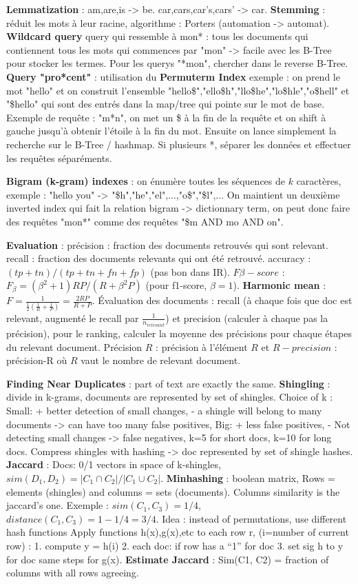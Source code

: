 \documentclass[9pt,a4paper]{report}
\begin{document}
\textbf{Lemmatization} : am,are,is -> be. car,cars,car's,cars' -> car. \textbf{Stemming} : réduit les mots à leur racine, algorithme : Porters (automation -> automat). \textbf{Wildcard query} query qui ressemble à mon* : tous les documents qui contiennent tous les mots qui commences par "mon" -> facile avec les B-Tree pour stocker les termes. Pour les querys "*mon", chercher dans le reverse B-Tree. \textbf{Query "pro*cent"} : utilisation du \textbf{Permuterm Index} exemple : on prend le mot "hello" et on construit l'ensemble "hello\$","ello\$h","llo\$he","lo\$hle","o\$hell" et "\$hello" qui sont des entrés dans la map/tree qui pointe sur le mot de base. Exemple de requête : "m*n", on met un \$ à la fin de la requête et on shift à gauche jusqu'à obtenir l'étoile à la fin du mot. Ensuite on lance simplement la recherche sur le B-Tree / hashmap. Si plusieurs *, séparer les données et effectuer les requêtes séparéments.

\textbf{Bigram (k-gram) indexes} : on énumère toutes les séquences de $k$ caractères, exemple : "hello you" -> "\$h","he","el",...,"o\$","\$l",... On maintient un deuxième inverted index qui fait la relation bigram -> dictionnary term, on peut donc faire des requêtes "mon*" comme des requêtes "\$m AND mo AND on".

\textbf{Evaluation} : précision : fraction des documents retrouvés qui sont relevant. recall : fraction des documents relevants qui ont été retrouvé. accuracy : $(tp+tn)/(tp+tn+fn+fp)$ (pas bon dans IR). $F\beta-score$ : $F_\beta=(\beta^2+1)RP/(R+\beta^2P)$ (pour f1-score, $\beta=1$). \textbf{Harmonic mean} : $F=\frac{1}{\frac{1}{2}(\frac{1}{R}+\frac{1}{P})}=\frac{2RP}{R+P}$. Évaluation des documents : recall (à chaque fois que doc est relevant, augmenté le recall par $\frac{1}{n_{relevant}}$) et precision (calculer à chaque pas la précision), pour le ranking, calculer la moyenne des précisions pour chaque étapes du relevant document. Précision $R$ : précision à l'élément $R$ et $R-precision$ : précision-R où $R$ vaut le nombre de relevant document.

\textbf{Finding Near Duplicates} : part of text are exactly the same. \textbf{Shingling} : divide in k-grams, documents are represented by set of shingles. Choice of k : Small: + better detection of small changes, - a shingle will belong to many documents -> can have too many false positives, Big: + less false positives, - Not detecting small changes -> false negatives, k=5 for short docs, k=10 for long docs. Compress shingles with hashing -> doc represented by set of shingle hashes. \textbf{Jaccard} : Docs: 0/1 vectors in space of k-shingles, $sim(D_1,D_2)=|C_1 \cap C_2|/|C_1\cup C_2|$. \textbf{Minhashing} : boolean matrix, Rows = elements (shingles) and columns = sets (documents). Columns similarity is the jaccard's one. Exemple : $sim(C_1,C_3)=1/4$, $distance(C_1,C_3)=1-1/4=3/4$. Idea : instead of permutations, use different hash functions Apply functions h(x),g(x),etc to each row r, (i=number of current row) : 1. compute y = h(i) 2. each doc: if row has a “1” for doc 3. set sig h to y for doc
same steps for g(x). \textbf{Estimate Jaccard} : Sim(C1, C2) = fraction of columns with all rows agreeing.
\end{document}
